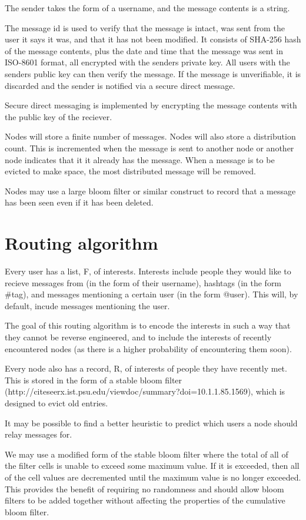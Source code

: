 \documentclass{article}
\begin{document}
The sender takes the form of a username, and the message contents is a string.

The message id is used to verify that the message is intact, was sent from the user it says it was, and that it has not been modified. It consists of SHA-256 hash of the message contents, plus the date and time that the message was sent in ISO-8601 format, all encrypted with the senders private key. All users with the senders public key can then verify the message. If the message is unverifiable, it is discarded and the sender is notified via a secure direct message.

Secure direct messaging is implemented by encrypting the message contents with the public key of the reciever.

Nodes will store a finite number of messages. Nodes will also store a distribution count. This is incremented when the message is sent to another node or another node indicates that it it already has the message. When a message is to be evicted to make space, the most distributed message will be removed.

Nodes may use a large bloom filter or similar construct to record that a message has been seen even if it has been deleted.

\section*{Routing algorithm}
Every user has a list, F, of interests. Interests include people they would like to recieve messages from (in the form of their username), hashtags (in the form \#tag), and messages mentioning a certain user (in the form @user). This will, by default, incude messages mentioning the user.

The goal of this routing algorithm is to encode the interests in such a way that they cannot be reverse engineered, and to include the interests of recently encountered nodes (as there is a higher probability of encountering them soon).

Every node also has a record, R, of interests of people they have recently met. This is stored in the form of a stable bloom filter (http://citeseerx.ist.psu.edu/viewdoc/summary?doi=10.1.1.85.1569), which is designed to evict old entries.

It may be possible to find a better heuristic to predict which users a node should relay messages for.

We may use a modified form of the stable bloom filter where the total of all of the filter cells is unable to exceed some maximum value. If it is exceeded, then all of the cell values are decremented until the maximum value is no longer exceeded. This provides the benefit of requiring no randomness and should allow bloom filters to be added together without affecting the properties of the cumulative bloom filter.
\end{document}
